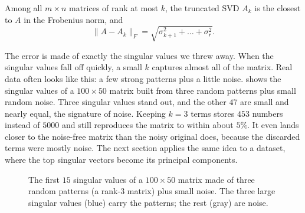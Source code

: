 \begin{theorem}
  \label{thm:eckart-young}
  Among all $m \times n$ matrices of rank at most $k$, the truncated SVD
  $A_k$ is the closest to $A$ in the Frobenius norm, and
  \[
    \|A - A_k\|_F = \sqrt{\sigma_{k+1}^2 + \dots + \sigma_r^2} .
  \]
\end{theorem}

The error is made of exactly the singular values we threw away. When the
singular values fall off quickly, a small $k$ captures almost all of the
matrix. Real data often looks like this: a few strong patterns plus a
little noise.  shows the singular values of
a $100 \times 50$ matrix built from three random patterns plus small
random noise. Three singular values stand out, and the other $47$ are
small and nearly equal, the signature of noise. Keeping $k = 3$ terms
stores $453$ numbers instead of $5000$ and still reproduces the matrix to
within about $5\%$. It even lands closer to the noise-free matrix than the
noisy original does, because the discarded terms were mostly noise. The
next section applies the same idea to a dataset, where the top singular
vectors become its principal components.

\begin{figure}[ht]
  \centering
  \caption{The first $15$ singular values of a $100 \times 50$ matrix made
    of three random patterns (a rank-$3$ matrix) plus small noise. The
    three large singular values (blue) carry the patterns; the rest (gray)
    are noise.}
  \label{fig:ch04-singular-values}
\end{figure}


